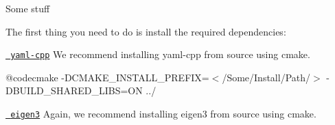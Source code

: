 Some stuff

The first thing you need to do is install the required dependencies\+:
\begin{DoxyItemize}
\item \href{https://github.com/jbeder/yaml-cpp}{\texttt{ yaml-\/cpp}} We recommend installing yaml-\/cpp from source using cmake.
\begin{DoxyEnumerate}
\item 
\begin{DoxyCode}{0}
\end{DoxyCode}

\item 
\begin{DoxyCode}{0}
\end{DoxyCode}

\item @codecmake -\/D\+C\+M\+A\+K\+E\+\_\+\+I\+N\+S\+T\+A\+L\+L\+\_\+\+P\+R\+E\+F\+IX=$<$/\+Some/\+Install/\+Path/$>$ -\/D\+B\+U\+I\+L\+D\+\_\+\+S\+H\+A\+R\+E\+D\+\_\+\+L\+I\+BS=ON ../ 
\item 
\begin{DoxyCode}{0}
\end{DoxyCode}

\end{DoxyEnumerate}
\item \href{http://eigen.tuxfamily.org/index.php}{\texttt{ eigen3}} Again, we recommend installing eigen3 from source using cmake.
\begin{DoxyEnumerate}
\item 
\begin{DoxyCode}{0}
\end{DoxyCode}

\item 
\begin{DoxyCode}{0}
\end{DoxyCode}

\item 
\begin{DoxyCode}{0}
\end{DoxyCode}

\item 
\begin{DoxyCode}{0}
\end{DoxyCode}

\end{DoxyEnumerate}
\end{DoxyItemize}

